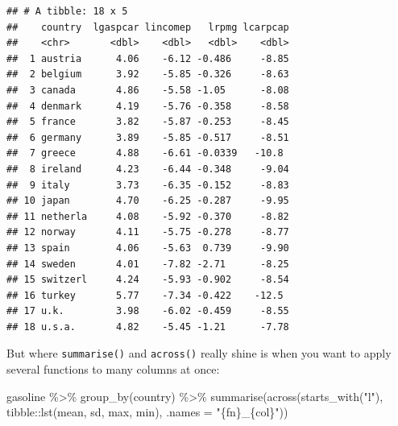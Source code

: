 \documentclass[
]{article}
\newenvironment{Shaded}{\begin{snugshade}}{\end{snugshade}}
\newcommand{\AttributeTok}[1]{\textcolor[rgb]{0.77,0.63,0.00}{#1}}
\newcommand{\FunctionTok}[1]{\textcolor[rgb]{0.00,0.00,0.00}{#1}}
\newcommand{\NormalTok}[1]{#1}
\newcommand{\SpecialCharTok}[1]{\textcolor[rgb]{0.00,0.00,0.00}{#1}}
\newcommand{\StringTok}[1]{\textcolor[rgb]{0.31,0.60,0.02}{#1}}
\begin{document}
\begin{verbatim}
## # A tibble: 18 x 5
##    country  lgaspcar lincomep   lrpmg lcarpcap
##    <chr>       <dbl>    <dbl>   <dbl>    <dbl>
##  1 austria      4.06    -6.12 -0.486     -8.85
##  2 belgium      3.92    -5.85 -0.326     -8.63
##  3 canada       4.86    -5.58 -1.05      -8.08
##  4 denmark      4.19    -5.76 -0.358     -8.58
##  5 france       3.82    -5.87 -0.253     -8.45
##  6 germany      3.89    -5.85 -0.517     -8.51
##  7 greece       4.88    -6.61 -0.0339   -10.8 
##  8 ireland      4.23    -6.44 -0.348     -9.04
##  9 italy        3.73    -6.35 -0.152     -8.83
## 10 japan        4.70    -6.25 -0.287     -9.95
## 11 netherla     4.08    -5.92 -0.370     -8.82
## 12 norway       4.11    -5.75 -0.278     -8.77
## 13 spain        4.06    -5.63  0.739     -9.90
## 14 sweden       4.01    -7.82 -2.71      -8.25
## 15 switzerl     4.24    -5.93 -0.902     -8.54
## 16 turkey       5.77    -7.34 -0.422    -12.5 
## 17 u.k.         3.98    -6.02 -0.459     -8.55
## 18 u.s.a.       4.82    -5.45 -1.21      -7.78
\end{verbatim}

But where \texttt{summarise()} and \texttt{across()} really shine is when you want to apply several functions
to many columns at once:

\begin{Shaded}
\begin{Highlighting}[]
\NormalTok{gasoline }\SpecialCharTok{\%\textgreater{}\%}
  \FunctionTok{group\_by}\NormalTok{(country) }\SpecialCharTok{\%\textgreater{}\%}
  \FunctionTok{summarise}\NormalTok{(}\FunctionTok{across}\NormalTok{(}\FunctionTok{starts\_with}\NormalTok{(}\StringTok{"l"}\NormalTok{), tibble}\SpecialCharTok{::}\FunctionTok{lst}\NormalTok{(mean, sd, max, min), }\AttributeTok{.names =} \StringTok{"\{fn\}\_\{col\}"}\NormalTok{))}
\end{Highlighting}
\end{Shaded}
\end{document}
